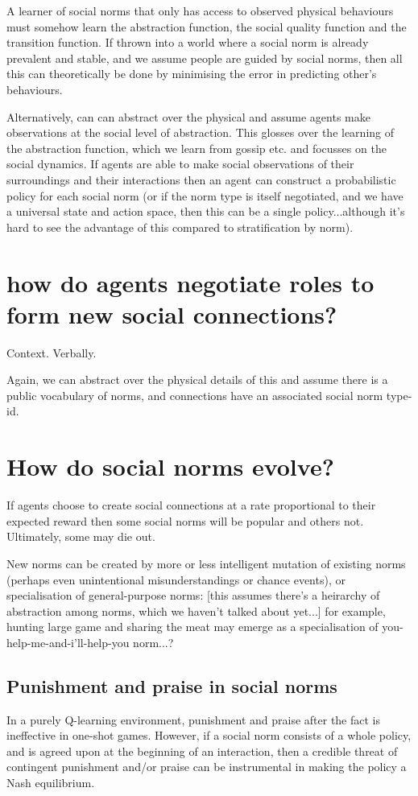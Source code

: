 \documentclass[a4paper]{article}
\begin{document}
A learner of social norms that only has access to observed physical behaviours must somehow learn the abstraction function, the social quality function and the transition function. If thrown into a world where a social norm is already prevalent and stable, and we assume people are guided by social norms, then all this can theoretically be done by minimising the error in predicting other's behaviours.

Alternatively, can can abstract over the physical and assume agents make observations at the social level of abstraction. This glosses over the learning of the abstraction function, which we learn from gossip etc. and focusses on the social dynamics. If agents are able to make social observations of their surroundings and their interactions then an agent can construct a probabilistic policy for each social norm (or if the norm type is itself negotiated, and we have a universal state and action space, then this can be a single policy...although it's hard to see the advantage of this compared to stratification by norm).


\section{how do agents negotiate roles to form new social connections?}
Context. Verbally.

Again, we can abstract over the physical details of this and assume there is a public vocabulary of norms, and connections have an associated social norm type-id.

\section{How do social norms evolve?}

If agents choose to create social connections at a rate proportional to their expected reward then some social norms will be popular and others not. Ultimately, some may die out.

New norms can be created by more or less intelligent mutation of existing norms (perhaps even unintentional misunderstandings or chance events), or specialisation of general-purpose norms: [this assumes there's a heirarchy of abstraction among norms, which we haven't talked about yet...] for example, hunting large game and sharing the meat may emerge as a specialisation of you-help-me-and-i'll-help-you norm...?

\subsection{Punishment and praise in social norms}

In a purely Q-learning environment, punishment and praise after the fact is ineffective in one-shot games. However, if a social norm consists of a whole policy, and is agreed upon at the beginning of an interaction, then a credible threat of contingent punishment and/or praise can be instrumental in making the policy a Nash equilibrium.
\end{document}
